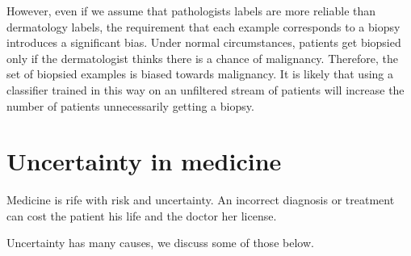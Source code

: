 \documentclass[9pt,twocolumn,twoside]{pnas-new}
\begin{document}
However, even if we assume that pathologists labels are more reliable
than dermatology labels, the requirement that each example corresponds
to a biopsy introduces a significant bias. Under normal circumstances, patients get
biopsied only if the dermatologist thinks there is a chance of
{\color{blue}malignancy. Therefore}, the set of biopsied examples is biased towards
{\color{blue}malignancy}. It is likely that using a classifier trained in this way
on an unfiltered stream of patients will increase the number of
patients unnecessarily getting a biopsy.

\section*{Uncertainty in medicine}

Medicine is rife with risk and uncertainty. An incorrect diagnosis or
treatment can cost the patient his life and the doctor her license.

Uncertainty has many causes, we discuss some of those below.

\end{document}
